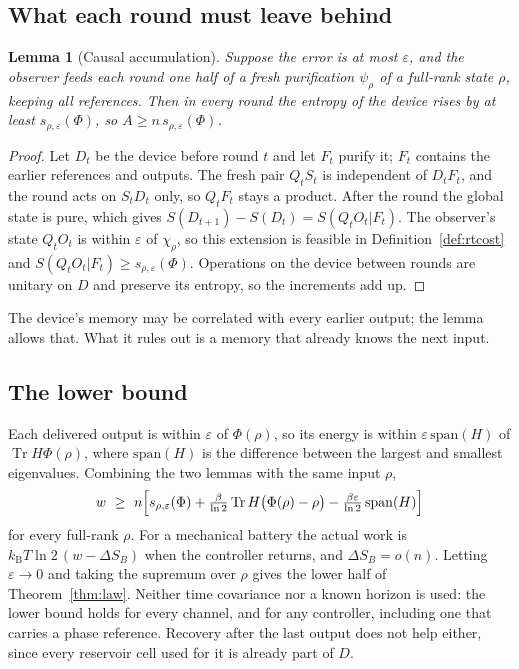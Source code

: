 \documentclass[11pt]{article}
\newtheorem{lemma}[theorem]{Lemma}
\theoremstyle{definition}
\theoremstyle{remark}
\newcommand{\Tr}{\operatorname{Tr}}
\newcommand{\kB}{k_{\mathrm B}}
\begin{document}
\subsection{What each round must leave behind}

\begin{lemma}[Causal accumulation]\label{lem:accumulation}
Suppose the error is at most $\varepsilon$, and the observer feeds each round one half of a fresh purification $\psi_\rho$ of a full-rank state $\rho$, keeping all references. Then in every round the entropy of the device rises by at least $s_{\rho,\varepsilon}(\Phi)$, so $A\ge n\,s_{\rho,\varepsilon}(\Phi)$.
\end{lemma}

\begin{proof}
Let $D_t$ be the device before round $t$ and let $F_t$ purify it; $F_t$ contains the earlier references and outputs. The fresh pair $Q_tS_t$ is independent of $D_tF_t$, and the round acts on $S_tD_t$ only, so $Q_tF_t$ stays a product. After the round the global state is pure, which gives $S(D_{t+1})-S(D_t)=S(Q_tO_t|F_t)$. The observer's state $Q_tO_t$ is within $\varepsilon$ of $\chi_\rho$, so this extension is feasible in Definition~\ref{def:rtcost} and $S(Q_tO_t|F_t)\ge s_{\rho,\varepsilon}(\Phi)$. Operations on the device between rounds are unitary on $D$ and preserve its entropy, so the increments add up.
\end{proof}

The device's memory may be correlated with every earlier output; the lemma allows that. What it rules out is a memory that already knows the next input.

\subsection{The lower bound}

Each delivered output is within $\varepsilon$ of $\Phi(\rho)$, so its energy is within $\varepsilon\,\mathrm{span}(H)$ of $\Tr H\Phi(\rho)$, where $\mathrm{span}(H)$ is the difference between the largest and smallest eigenvalues. Combining the two lemmas with the same input $\rho$,
\begin{equation}\label{eq:converse}
w\ \ge\ n\Bigl[s_{\rho,\varepsilon}(\Phi)+\tfrac{\beta}{\ln2}\Tr H\bigl(\Phi(\rho)-\rho\bigr)-\tfrac{\beta\varepsilon}{\ln2}\,\mathrm{span}(H)\Bigr]
\end{equation}
for every full-rank $\rho$. For a mechanical battery the actual work is $\kB T\ln2\,(w-\Delta S_B)$ when the controller returns, and $\Delta S_B=o(n)$. Letting $\varepsilon\to0$ and taking the supremum over $\rho$ gives the lower half of Theorem~\ref{thm:law}. Neither time covariance nor a known horizon is used: the lower bound holds for every channel, and for any controller, including one that carries a phase reference. Recovery after the last output does not help either, since every reservoir cell used for it is already part of $D$.
\end{document}
